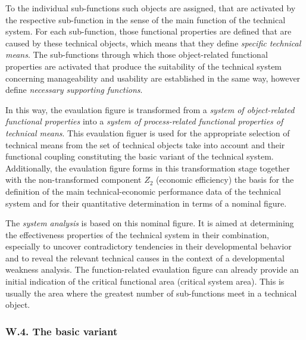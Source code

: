 \documentclass[11pt,a4paper]{article}
\begin{document}
To the individual sub-functions such objects are assigned, that are activated
by the respective sub-function in the sense of the main function of the
technical system. For each sub-function, those functional properties are
defined that are caused by these technical objects, which means that they
define \emph{specific technical means}. The sub-functions through which those
object-related functional properties are activated that produce the
suitability of the technical system concerning manageability and usability are
established in the same way, however define \emph{necessary supporting
  functions}.

In this way, the evaulation figure is transformed from a \emph{system of
  object-related functional properties} into a \emph{system of process-related
  functional properties of technical means}. This evaulation figuer is used for
the appropriate selection of technical means from the set of technical objects
take into account and their functional coupling constituting the basic variant
of the technical system. Additionally, the evaulation figure forms in this
transformation stage together with the non-transformed component $Z_2$
(economic efficiency) the basis for the definition of the main
technical-economic performance data of the technical system and for their
quantitative determination in terms of a nominal figure.

The \emph{system analysis} is based on this nominal figure. It is aimed at
determining the effectiveness properties of the technical system in their
combination, especially to uncover contradictory tendencies in their
developmental behavior and to reveal the relevant technical causes in the
context of a developmental weakness analysis. The function-related evaulation
figure can already provide an initial indication of the critical functional
area (critical system area). This is usually the area where the greatest
number of sub-functions meet in a technical object.

\subsubsection*{W.4. The basic variant}
\end{document}
